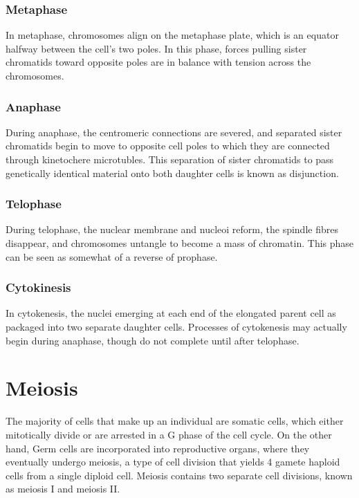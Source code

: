 \documentclass[12pt,titlepage]{article}
\begin{document}
      \subsubsection{Metaphase}
        In metaphase, chromosomes align on the metaphase plate, which is an equator halfway between the cell's two poles. In this phase, forces pulling sister
        chromatids toward opposite poles are in balance with tension across the chromosomes.

      \subsubsection{Anaphase}
        During anaphase, the centromeric connections are severed, and separated sister chromatids begin to move to opposite cell poles to which they are connected
        through kinetochere microtubles. This separation of sister chromatids to pass genetically identical material onto both daughter cells is known as disjunction.

      \subsubsection{Telophase}
        During telophase, the nuclear membrane and nucleoi reform, the spindle fibres disappear, and chromosomes untangle to become a mass of chromatin. This phase can be
        seen as somewhat of a reverse of prophase.

      \subsubsection{Cytokinesis}
        In cytokenesis, the nuclei emerging at each end of the elongated parent cell as packaged into two separate daughter cells. Processes of cytokenesis may actually
        begin during anaphase, though do not complete until after telophase.

  \newpage

  \section{Meiosis}
    The majority of cells that make up an individual are somatic cells, which either mitotically divide or are arrested in a G phase of the cell cycle. On the other hand,
    Germ cells are incorporated into reproductive organs, where they eventually undergo meiosis, a type of cell division that yields 4 gamete haploid cells from a single
    diploid cell. Meiosis contains two separate cell divisions, known as meiosis I and meiosis II.
\end{document}
